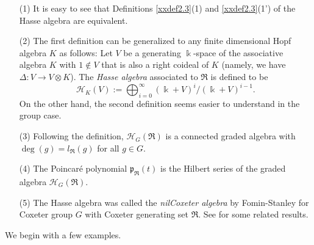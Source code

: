\begin{remark}
\label{xxrem2.4}
\begin{enumerate}
\item[(1)]
It is easy to see that Definitions \ref{xxdef2.3}(1) and \ref{xxdef2.3}(1') 
of the Hasse algebra are equivalent.
\item[(2)]
The first definition can be generalized to any finite dimensional Hopf 
algebra $K$ as follows: Let $V$ be a generating $\Bbbk$-space of the 
associative algebra $K$ with $1\not\in V$ that
is also a right coideal of $K$ (namely, we have $\Delta: V\to V\otimes K$). 
The {\it Hasse algebra} associated to $\Re$ is defined to be
$${\mathcal H}_K(V):=\bigoplus_{i=0}^{\infty} (\Bbbk+V)^i/(\Bbbk+V)^{i-1}.$$
On the other hand, the second definition seems easier to understand 
in the group case.
\item[(3)]
Following the definition, ${\mathcal H}_G(\Re)$ is a connected
graded algebra with $\deg (g)={l_{\Re}}(g)$ for all $g\in G$.  
\item[(4)]
The Poincar{\'e} polynomial ${\mathfrak{p}}_\Re(t)$ is the Hilbert series 
of the graded algebra ${\mathcal H}_G(\Re)$.
\item[(5)]
The Hasse algebra was called the {\it nilCoxeter algebra} by
Fomin-Stanley \cite{FS} for Coxeter group $G$ with 
Coxeter generating set $\Re$. See \cite{Al} for some
related results. 
\end{enumerate}
\end{remark}

We begin with a few examples.

